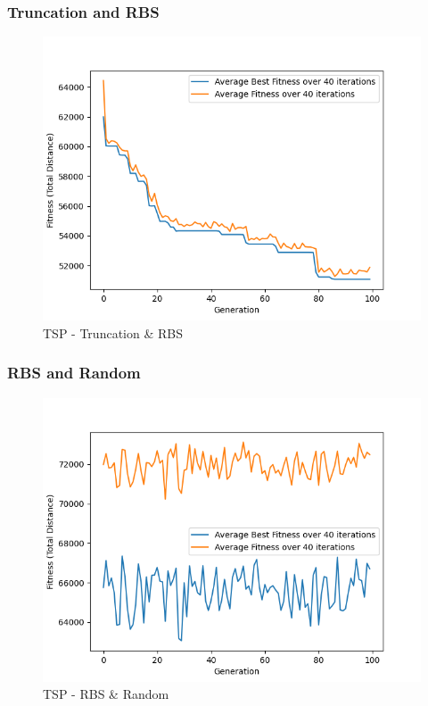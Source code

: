 \documentclass[11pt, letterpaper]{article}
\begin{document}
\subsubsection {Truncation and RBS}
\begin{figure}[H]
    \centering
    \includegraphics[scale = 0.6]{images/tsp_tr_rb.png}
    \caption {TSP - Truncation \& RBS}
    \label {fig:tpsTR}
\end{figure}
\subsubsection {RBS and Random}
\begin{figure}[H]
    \centering
    \includegraphics[scale = 0.6]{images/tsp_rb_rd.png}
    \caption {TSP - RBS \& Random}
    \label {fig:tpsRbR}
\end{figure}
\end{document}
